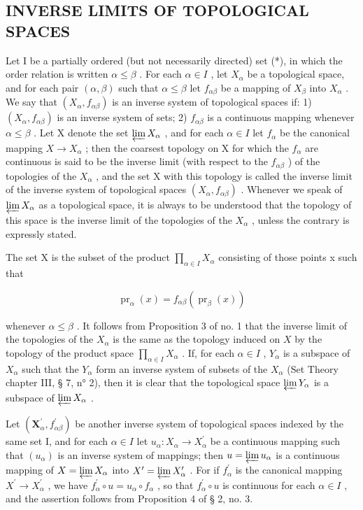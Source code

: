 \subsection{INVERSE LIMITS OF TOPOLOGICAL SPACES}

Let I be a partially ordered (but not necessarily directed) set (*), in which the order relation is written \(\alpha \leqslant \beta\) . For each \(\alpha \in I\) , let \(X_{\alpha}\) be a topological space, and for each pair \((\alpha, \beta)\) such that \(\alpha \leqslant \beta\) let \(f_{\alpha\beta}\) be a mapping of \(X_{\beta}\) into \(X_{\alpha}\) . We say that \((X_{\alpha}, f_{\alpha\beta})\) is an inverse system of topological spaces if: 1) \((X_{\alpha}, f_{\alpha\beta})\) is an inverse system of sets; 2) \(f_{\alpha\beta}\) is a continuous mapping whenever \(\alpha \leqslant \beta\) . Let X denote the set \(\varprojlim X_{\alpha}\) , and for each \(\alpha \in I\) let \(f_{\alpha}\) be the canonical mapping \(X \to X_{\alpha}\) ; then the coarsest topology on X for which the \(f_{\alpha}\) are continuous is said to be the inverse limit (with respect to the \(f_{\alpha\beta}\) ) of the topologies of the \(X_{\alpha}\) , and the set X with this topology is called the inverse limit of the inverse system of topological spaces \((X_{\alpha}, f_{\alpha\beta})\) . Whenever we speak of \(\varprojlim X_{\alpha}\) as a topological space, it is always to be understood that the topology of this space is the inverse limit of the topologies of the \(X_{\alpha}\) , unless the contrary is expressly stated.

The set X is the subset of the product \(\prod_{\alpha\in I}X_{\alpha}\) consisting of those points x such that

\[
\operatorname{pr} _ {\alpha} (x) = f _ {\alpha \beta} (\operatorname{pr} _ {\beta} (x))\tag{I}
\]

whenever \(\alpha \leqslant \beta\) . It follows from Proposition 3 of no. 1 that the inverse limit of the topologies of the \(X_{\alpha}\) is the same as the topology induced on \(X\) by the topology of the product space \(\prod_{\alpha \in I} X_{\alpha}\) . If, for each \(\alpha \in I\) , \(Y_{\alpha}\) is a subspace of \(X_{\alpha}\) such that the \(Y_{\alpha}\) form an inverse system of subsets of the \(X_{\alpha}\) (Set Theory chapter III, § 7, n° 2), then it is clear that the topological space \(\varprojlim Y_{\alpha}\) is a subspace of \(\varprojlim X_{\alpha}\) .

Let \((\mathbf{X}_{\alpha}^{\prime}, f_{\alpha\beta}^{\prime})\) be another inverse system of topological spaces indexed by the same set I, and for each \(\alpha \in I\) let \(u_{\alpha}: X_{\alpha} \to X_{\alpha}^{\prime}\) be a continuous mapping such that \((u_{\alpha})\) is an inverse system of mappings; then \(u = \varprojlim u_{\alpha}\) is a continuous mapping of \(X = \varprojlim X_{\alpha}\) into \(X^{\prime} = \varprojlim X_{\alpha}^{\prime}\) . For if \(f_{\alpha}^{\prime}\) is the canonical mapping \(X^{\prime} \to X_{\alpha}^{\prime}\) , we have \(f_{\alpha}^{\prime} \circ u = u_{\alpha} \circ f_{\alpha}\) , so that \(f_{\alpha}^{\prime} \circ u\) is continuous for each \(\alpha \in I\) , and the assertion follows from Proposition 4 of § 2, no. 3.

